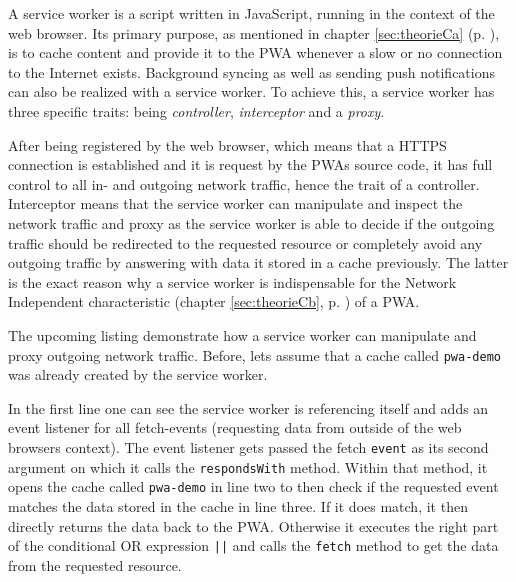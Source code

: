 A service worker is a script written in JavaScript, running in the context of the web browser. Its primary purpose, as mentioned in chapter \ref{sec:theorieCa} (p. \pageref{sec:theorieCa}), is to cache content and provide it to the PWA whenever a slow or no connection to the Internet exists. Background syncing as well as sending push notifications can also be realized with a service worker. To achieve this, a service worker has three specific traits: being \textit{controller}, \textit{interceptor} and a \textit{proxy}. \cite[p. TODO(Buch Zuhause durchsuchen wo es war]{liebelProgressiveWebApps2019}

After being registered by the web browser, which means that a HTTPS connection is established and it is request by the PWAs source code, it has full control to all in- and outgoing network traffic, hence the trait of a controller. Interceptor means that the service worker can manipulate and inspect the network traffic and proxy as the service worker is able to decide if the outgoing traffic should be redirected to the requested resource or completely avoid any outgoing traffic by answering with data it stored in a cache previously. The latter is the exact reason why a service worker is indispensable for the Network Independent characteristic (chapter \ref{sec:theorieCb}, p. \pageref{sec:theorieCb}) of a PWA. \cite[p. TODO(Buch Zuhause durchsuchen wo es war)]{liebelProgressiveWebApps2019}

The upcoming listing demonstrate how a service worker can manipulate and proxy outgoing network traffic. Before, lets assume that a cache called \texttt{pwa-demo} was already created by the service worker.

\begin{center}
	\begin{minipage}{\textwidth}
		
	\end{minipage}
\end{center}

In the first line one can see the service worker is referencing itself and adds an event listener for all fetch-events (requesting data from outside of the web browsers context). The event listener gets passed the fetch \texttt{event} as its second argument on which it calls the \texttt{respondsWith} method. Within that method, it opens the cache called \texttt{pwa-demo} in line two to then check if the requested event matches the data stored in the cache in line three. If it does match, it then directly returns the data back to the PWA. Otherwise it executes the right part of the conditional OR expression \texttt{||} and calls the \texttt{fetch} method to get the data from the requested resource. \cite[p. 60]{liebelProgressiveWebApps2019}

